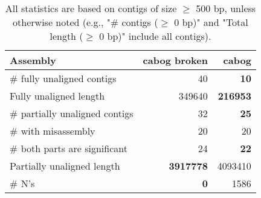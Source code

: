 \documentclass[12pt,a4paper]{article}
\begin{document}
\begin{table}[ht]
\begin{center}
\caption{All statistics are based on contigs of size $\geq$ 500 bp, unless otherwise noted (e.g., "\# contigs ($\geq$ 0 bp)" and "Total length ($\geq$ 0 bp)" include all contigs).}
\begin{tabular}{|l*{2}{|r}|}
\hline
Assembly & cabog broken & cabog \\ \hline
\# fully unaligned contigs & 40 & {\bf 10} \\ \hline
Fully unaligned length & 349640 & {\bf 216953} \\ \hline
\# partially unaligned contigs & 32 & {\bf 25} \\ \hline
\hspace{5mm}\# with misassembly & 20 & 20 \\ \hline
\hspace{5mm}\# both parts are significant & 24 & {\bf 22} \\ \hline
Partially unaligned length & {\bf 3917778} & 4093410 \\ \hline
\# N's & {\bf 0} & 1586 \\ \hline
\end{tabular}
\end{center}
\end{table}
\end{document}
